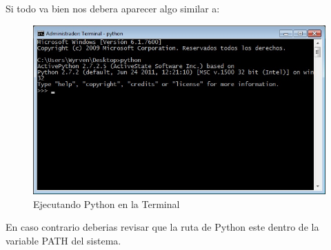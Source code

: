 Si todo va bien nos debera aparecer algo similar a:

\begin{figure}[h]
    \centering
    \includegraphics[scale=0.7]{resourse/consola-python.jpg}
    \caption{Ejecutando Python en la Terminal}
    \label{fig:01}
\end{figure}    

En caso contrario deberias revisar que la ruta de Python este dentro de la variable
 PATH del sistema.




